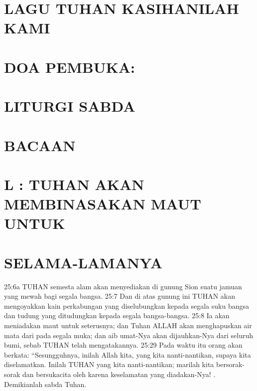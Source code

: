 \section*{LAGU TUHAN KASIHANILAH KAMI}

\section*{DOA PEMBUKA:}



\section*{LITURGI SABDA}

\section*{BACAAN}


\section*{L : TUHAN AKAN MEMBINASAKAN MAUT UNTUK}

\section*{SELAMA-LAMANYA}

25:6a TUHAN semesta alam akan menyediakan di gunung Sion
suatu jamuan yang mewah bagi segala bangsa. 25:7 Dan di atas
gunung ini TUHAN akan mengoyakkan kain perkabungan yang
diselubungkan kepada segala suku bangsa dan tudung yang
ditudungkan kepada segala bangsa-bangsa. 25:8 Ia akan meniadakan
maut untuk seterusnya; dan Tuhan ALLAH akan menghapuskan air
mata dari pada segala muka; dan aib umat-Nya akan dijauhkan-Nya
dari seluruh bumi, sebab TUHAN telah mengatakannya. 25:29 Pada
waktu itu orang akan berkata: “Sesungguhnya, inilah Allah kita, yang
kita nanti-nantikan, supaya kita diselamatkan. Inilah TUHAN yang
kita nanti-nantikan; marilah kita bersorak-sorak dan bersukacita oleh
karena keselamatan yang diadakan-Nya! . Demikianlah sabda Tuhan.

